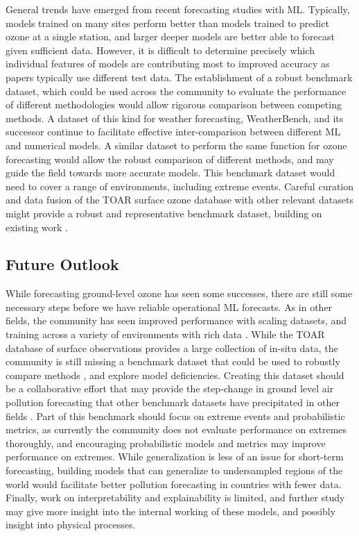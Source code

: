 \documentclass[gmd, manuscript]{copernicus}
\begin{document}
General trends have emerged from recent forecasting studies with ML. Typically, models trained on many sites perform better than models trained to predict ozone at a single station, and larger deeper models are better able to forecast given sufficient data. However, it is difficult to determine precisely which individual features of models are contributing most to improved accuracy as papers typically use different test data. The establishment of a robust benchmark dataset, which could be used across the community to evaluate the performance of different methodologies would allow rigorous comparison between competing methods. A dataset of this kind for weather forecasting, WeatherBench, and its successor \citep{Rasp2020, Rasp2024} continue to facilitate effective inter-comparison between different ML and numerical models. A similar dataset to perform the same function for ozone forecasting would allow the robust comparison of different methods, and may guide the field towards more accurate models. This benchmark dataset would need to cover a range of environments, including extreme events. Careful curation and data fusion of the TOAR surface ozone database with other relevant datasets might provide a robust and representative benchmark dataset, building on existing work \citep{Betancourt2021}.

\subsection{Future Outlook}
While forecasting ground-level ozone has seen some successes, there are still some necessary steps before we have reliable operational ML forecasts. As in other fields, the community has seen improved performance with scaling datasets, and training across a variety of environments with rich data \citep{leufen_o3resnet_2023}. While  the TOAR database of surface observations provides a large collection of in-situ data, the community is still missing a benchmark dataset that could be used to robustly compare methods \citep{Dueben2022, Rasp2024}, and explore model deficiencies. Creating this dataset should be a collaborative effort that may provide the step-change in ground level air pollution forecasting that other benchmark datasets have precipitated in other fields \citep{Deng2009}. Part of this benchmark should focus on extreme events and probabilistic metrics, as currently the community does not evaluate performance on extremes thoroughly, and encouraging probabilistic models and metrics may improve performance on extremes. While generalization is less of an issue for short-term forecasting, building models that can generalize to undersampled regions of the world would facilitate better pollution forecasting in countries with fewer data. Finally, work on interpretability and explainability is limited, and further study may give more insight into the internal working of these models, and possibly insight into physical processes.
\end{document}
